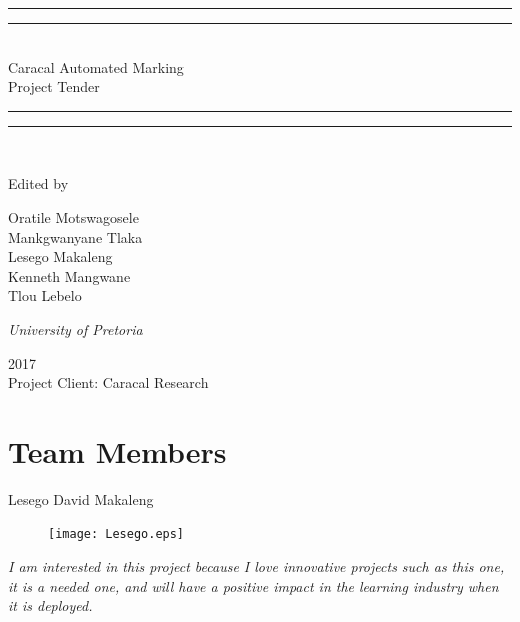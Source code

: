 \documentclass{article}
\newcommand*{\titleGP}{\begingroup %
\centering %
\vspace*{\baselineskip} %

\rule{\textwidth}{1.6pt}\vspace*{-\baselineskip}\vspace*{2pt} %
\rule{\textwidth}{0.4pt}\\[\baselineskip] %

{\LARGE Caracal Automated Marking\\ Project  Tender}\\[0.2\baselineskip] %

\rule{\textwidth}{0.4pt}\vspace*{-\baselineskip}\vspace{3.2pt} %
\rule{\textwidth}{1.6pt}\\[\baselineskip] %

\scshape %
\vspace*{2\baselineskip} %

Edited by \\[\baselineskip]
{\Large Oratile Motswagosele \\ Mankgwanyane Tlaka \\ Lesego Makaleng \\ Kenneth Mangwane \\ Tlou Lebelo\par} %

{\itshape University of Pretoria\par} %

\vfill %

{\scshape 2017} \\[0.3\baselineskip] %
{ Project Client: Caracal Research}\par %

\endgroup}
\begin{document}
 

\titleGP %
\pagebreak

\section{Team Members}
\centering
{\huge Lesego David Makaleng}
\begin{figure}[h]
\centering
\texttt{[image: Lesego.eps]} 
\end{figure}

 	\textit{I am interested in this project because I love innovative projects such as this one, it is a needed one, and will have a positive impact in the learning industry when it is deployed.}
\end{document}
